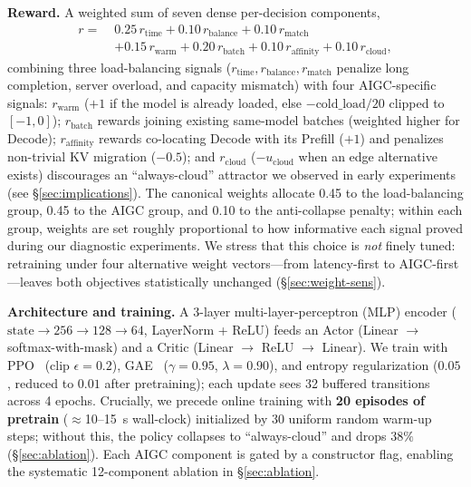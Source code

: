 \textbf{Reward.} A weighted sum of seven dense per-decision
components,
\begin{equation}
  \label{eq:reward}
  \begin{aligned}
    r =\;& 0.25\,r_{\text{time}}
        + 0.10\,r_{\text{balance}}
        + 0.10\,r_{\text{match}} \\
       &+ 0.15\,r_{\text{warm}}
        + 0.20\,r_{\text{batch}}
        + 0.10\,r_{\text{affinity}}
        + 0.10\,r_{\text{cloud}},
  \end{aligned}
\end{equation}
combining three load-balancing signals
($r_{\text{time}}, r_{\text{balance}}, r_{\text{match}}$
penalize long completion, server overload, and capacity
mismatch) with four AIGC-specific signals: $r_{\text{warm}}$
($+1$ if the model is already loaded, else
$-\text{cold\_load}/20$ clipped to $[-1,0]$);
$r_{\text{batch}}$ rewards joining existing same-model
batches (weighted higher for Decode);
$r_{\text{affinity}}$ rewards co-locating Decode with its
Prefill ($+1$) and penalizes non-trivial KV migration
($-0.5$); and $r_{\text{cloud}}$ ($-u_{\text{cloud}}$
when an edge alternative exists) discourages an
``always-cloud'' attractor we observed in early experiments
(see \S\ref{sec:implications}).
The canonical weights allocate 0.45 to the load-balancing
group, 0.45 to the AIGC group, and 0.10 to the anti-collapse
penalty; within each group, weights are set roughly
proportional to how informative each signal proved during our
diagnostic experiments. We stress that this choice is
\emph{not} finely tuned: retraining under four alternative
weight vectors---from latency-first to AIGC-first---leaves
both objectives statistically unchanged
(\S\ref{sec:weight-sens}).

\textbf{Architecture and training.} A 3-layer
multi-layer-perceptron (MLP) encoder
($\text{state} \to 256 \to 128 \to 64$, LayerNorm + ReLU)
feeds an Actor (Linear $\to$ softmax-with-mask) and a Critic
(Linear $\to$ ReLU $\to$ Linear). We train with
PPO~\cite{schulman2017ppo} (clip $\epsilon{=}0.2$),
GAE~\cite{schulman2015gae} ($\gamma{=}0.95$,
$\lambda{=}0.90$), and entropy regularization ($0.05$,
reduced to $0.01$ after pretraining); each update sees 32
buffered transitions across 4 epochs. Crucially, we precede
online training with \textbf{20 episodes of pretrain}
(${\approx}$10--15~s wall-clock) initialized by 30 uniform
random warm-up steps; without this, the policy collapses to
``always-cloud'' and \slo{} drops $38\%$ (\S\ref{sec:ablation}).
Each AIGC component is gated by a constructor flag, enabling
the systematic 12-component ablation in
\S\ref{sec:ablation}.
